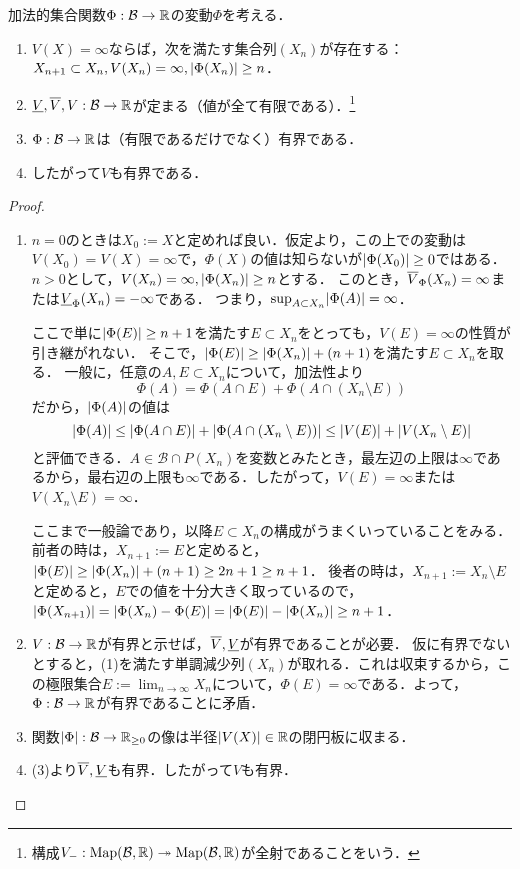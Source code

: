 \documentclass[uplatex, dvipdfmx]{jsreport}
\renewcommand{\B}{\mathcal{B}}
\begin{document}
\begin{lemma}[変動は有界である]
    加法的集合関数$\Phi:\B\to\R$の変動$\Phi$を考える．
    \begin{enumerate}
        \item $V(X)=\infty$ならば，次を満たす集合列$(X_n)$が存在する：$X_{n+1}\subset X_n,V(X_n)=\infty,\lvert\Phi(X_n)\rvert\ge n$．
        \item $\u{V},\o{V},V:\B\to\R$が定まる（値が全て有限である）．\footnote{構成$V_-:\Map(\B,\R)\epi\Map(\B,\R)$が全射であることをいう．}
        \item $\Phi:\B\to\R$は（有限であるだけでなく）有界である．
        \item したがって$V$も有界である．
    \end{enumerate}
\end{lemma}
\begin{proof}\mbox{}
    \begin{enumerate}
        \item $n=0$のときは$X_0:=X$と定めれば良い．仮定より，この上での変動は$V(X_0)=V(X)=\infty$で，$\Phi(X)$の値は知らないが$\lvert\Phi(X_0)\rvert\ge 0$ではある．
        $n>0$として，$V(X_n)=\infty,\lvert\Phi(X_n)\rvert\ge n$とする．
        このとき，$\overline{V}_\Phi(X_n)=\infty$または$\underline{V}_\Phi(X_n)=-\infty$である．
        つまり，$\sup_{A\subset X_n}\lvert\Phi(A)\rvert=\infty$．

        ここで単に$\lvert\Phi(E)\rvert\ge n+1$を満たす$E\subset X_n$をとっても，$V(E)=\infty$の性質が引き継がれない．
        そこで，$\lvert\Phi(E)\rvert\ge\lvert\Phi(X_n)\rvert+(n+1)$を満たす$E\subset X_n$を取る．
        一般に，任意の$A,E\subset X_n$について，加法性より
        \[\Phi(A)=\Phi(A\cap E)+\Phi(A\cap(X_n\setminus E))\]
        だから，$\lvert\Phi(A)\rvert$の値は
        \[\lvert\Phi(A)\rvert\le\lvert\Phi(A\cap E)\rvert+\lvert\Phi(A\cap(X_n\setminus E))\rvert\le\lvert V(E)\rvert+\lvert V(X_n\setminus E)\rvert\]
        と評価できる．$A\in\B\cap P(X_n)$を変数とみたとき，最左辺の上限は$\infty$であるから，最右辺の上限も$\infty$である．したがって，$V(E)=\infty$または$V(X_n\setminus E)=\infty$．
        
        ここまで一般論であり，以降$E\subset X_n$の構成がうまくいっていることをみる．
        前者の時は，$X_{n+1}:=E$と定めると，$\lvert\Phi(E)\rvert\ge\lvert\Phi(X_n)\rvert+(n+1)\ge 2n+1\ge n+1$．
        後者の時は，$X_{n+1}:=X_n\setminus E$と定めると，$E$での値を十分大きく取っているので，$\lvert\Phi(X_{n+1})\rvert=\lvert\Phi(X_n)-\Phi(E)\rvert=\lvert\Phi(E)\rvert-\lvert\Phi(X_n)\rvert\ge n+1$．
        \item $V:\B\to\R$が有界と示せば，$\overline{V},\underline{V}$が有界であることが必要．
        仮に有界でないとすると，(1)を満たす単調減少列$(X_n)$が取れる．これは収束するから，この極限集合$E:=\lim_{n\to\infty}X_n$について，$\Phi(E)=\infty$である．よって，$\Phi:\B\to\R$が有界であることに矛盾．
        \item 関数$\abs{\Phi}:\B\to\R_{\ge 0}$の像は半径$\lvert V(X)\rvert\in\mathbb{R}$の閉円板に収まる．
        \item (3)より$\overline{V},\underline{V}$も有界．したがって$V$も有界．
    \end{enumerate}
\end{proof}
\end{document}
